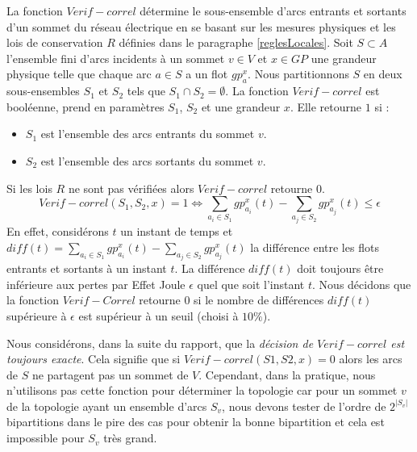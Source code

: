 \label{VerifCorrel}
La fonction $Verif-correl$ d\'etermine le sous-ensemble d'arcs entrants et sortants d'un sommet du r\'eseau \'electrique en se basant sur les mesures physiques et les lois de conservation $R$ d\'efinies dans le paragraphe \ref{reglesLocales}. 
\newline
Soit $S \subset A$ l'ensemble  fini d'arcs incidents \`a un sommet  $v \in V$ et 
$x \in GP$ une grandeur physique 
telle que chaque arc $a \in S$ a un flot $gp_{a}^{x}$.
Nous partitionnons $S$ en deux sous-ensembles $S_1$ et $S_2$ tels que $S_1 \cap S_2  = \emptyset$.
\newline
La fonction $Verif-correl$ est bool\'eenne, prend en param\`etres $S_1$, $S_2$ et une grandeur $x$. 
Elle retourne $1$ si :
\begin{itemize}
	\item $S_1$ est l'ensemble des arcs entrants du sommet $v$.
	\item $S_2$ est l'ensemble des arcs sortants du sommet $v$.
\end{itemize} 
Si les lois $R$ ne sont pas v\'erifi\'ees alors $Verif-correl$ retourne $0$.
$$
Verif-correl(S_1, S_2, x) = 1 \Leftrightarrow  \sum_{ a_i \in S_1} gp_{a_i}^{x}(t) - \sum_{a_ j\in S_2} gp_{a_j}^{x}(t)  \le \epsilon 
$$
En effet, consid\'erons $t$ un instant de temps et 
		$diff(t) =  \sum_{ a_i \in S_1} gp_{a_i}^{x}(t) - \sum_{a_ j\in S_2} gp_{a_j}^{x}(t)$ 
la diff\'erence entre les flots entrants et sortants \`a un instant $t$.
La diff\'erence $diff(t)$ doit toujours \^etre inf\'erieure aux pertes par Effet Joule $\epsilon$ quel que soit l'instant $t$. 
\newline
Nous d\'ecidons que la fonction $Verif-Correl$ retourne $0$ si 
le nombre de diff\'erences $diff(t)$ sup\'erieure \`a $\epsilon$ est sup\'erieur \`a un seuil (choisi \`a $10\%$).
\newline


Nous consid\'erons, dans la suite du rapport, que la {\em d\'ecision de $Verif-correl$ est toujours exacte}. Cela signifie que 
si $Verif-correl(S1, S2, x) = 0$ alors les arcs de $S$ ne partagent pas un sommet de $V$.
Cependant, dans la pratique, nous n'utilisons pas cette fonction pour d\'eterminer la topologie car pour un sommet $v$ de la topologie ayant un ensemble d'arcs $S_v$, nous devons  tester de l'ordre de $2^{|S_{v}|}$ bipartitions dans le pire des cas pour obtenir la bonne bipartition et cela est impossible pour $S_{v}$ tr\`es grand. 
